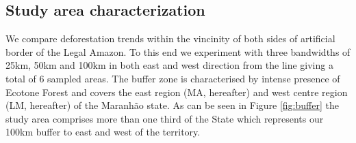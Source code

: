 

\subsection{Study area characterization} \label{studycarac} %


We compare deforestation trends within the vincinity of both sides of artificial border of the Legal Amazon.  To this end we experiment with three bandwidths of 25km, 50km and 100km in both east and west direction from the line giving a total of 6 sampled areas. The buffer zone is characterised by intense presence of Ecotone Forest and covers the east region (MA, hereafter) and west centre region (LM, hereafter) of the Maranhão state. As can be seen in Figure \ref{fig:buffer} the study area comprises more than one third of the State which represents our 100km buffer to east and west of the territory.

